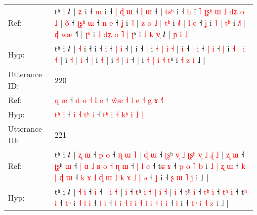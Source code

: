 \documentclass[10pt]{article}
\DeclareRobustCommand{\hl}[1]{{\textcolor{red}{#1}}}
\begin{document}
\begin{longtable}{ll}
Ref: & tʰ i ˩˥ | \hl{ʑ} i ˧\hl{ }\hl{m} i ˧\hl{ }\hl{|}\hl{ }\hl{ɖ} \hl{ɯ} ˧ \hl{ɭ} \hl{ɯ} ˧ |\hl{ }\hl{t}\hl{s}\hl{ʰ} i ˧ \hl{h} i\hl{̃}\hl{ }\hl{˥}\hl{ }\hl{ʈ}\hl{ʂ}\hl{ʰ}\hl{ }\hl{ɯ} \hl{˩} \hl{d}\hl{ʑ} \hl{o} \hl{˩} | \hl{o}\hl{̃} ˧ \hl{ʈ}\hl{ʂ}\hl{ʰ} \hl{ɯ} ˧ \hl{n} \hl{e} ˧ \hl{ʝ} i \hl{˥} |\hl{ }\hl{z} \hl{o} \hl{˩} |\hl{ }\hl{t}\hl{ʰ} i \hl{˩}\hl{˥} |\hl{ }\hl{l} \hl{e} ˧ \hl{ʝ} i \hl{˥} |\hl{ }\hl{t}\hl{ʰ} i \hl{˩}\hl{˥} |\hl{ }\hl{ɖ} \hl{w}\hl{æ} ˧\hl{˥} |\hl{ }\hl{ʈ}\hl{ʰ} i\hl{ }\hl{˩} \hl{d}\hl{ʑ} \hl{o} \hl{˥} \hl{|} \hl{ʈ}ʰ i \hl{˩} \hl{k} \hl{v}\hl{̩} ˩\hl{˥} |\hl{ }\hl{ɲ}\hl{ }\hl{i}\hl{ }\hl{˩}
 \\
Hyp: & tʰ i ˩˥ | \hl{˧} i ˧\hl{}\hl{} i ˧\hl{}\hl{}\hl{}\hl{} \hl{i} ˧ \hl{|} \hl{i} ˧ |\hl{}\hl{}\hl{}\hl{} i ˧ \hl{|} i\hl{}\hl{}\hl{}\hl{}\hl{}\hl{}\hl{}\hl{}\hl{} \hl{˧} \hl{}\hl{|} \hl{i} \hl{˧} | \hl{}\hl{i} ˧ \hl{}\hl{}\hl{|} \hl{i} ˧ \hl{|} \hl{i} ˧ \hl{|} i \hl{˧} |\hl{}\hl{} \hl{i} \hl{˧} |\hl{}\hl{}\hl{} i \hl{}\hl{˧} |\hl{}\hl{} \hl{i} ˧ \hl{|} i \hl{˧} |\hl{}\hl{}\hl{} i \hl{}\hl{˧} |\hl{}\hl{} \hl{}\hl{i} ˧\hl{} |\hl{}\hl{}\hl{} i\hl{}\hl{} \hl{}\hl{˧} \hl{|} \hl{i} \hl{˧} \hl{t}ʰ i \hl{˧} \hl{z} \hl{}\hl{i} ˩\hl{} |\hl{}\hl{}\hl{}\hl{}\hl{}\hl{}
 \\
\midrule
Utterance ID: & 220 \\
Ref: & \hl{}\hl{q} \hl{æ} ˧ \hl{d} \hl{o} \hl{˧}\hl{ }\hl{l} \hl{e} ˧ \hl{w}\hl{̃}\hl{æ} \hl{˧} \hl{l} \hl{e}\hl{ }\hl{˧} \hl{g} \hl{ɤ} \hl{˧}\hl{˥}
 \\
Hyp: & \hl{t}\hl{ʰ} \hl{i} ˧ \hl{i} \hl{˧} \hl{}\hl{t}\hl{ʰ} \hl{i} ˧ \hl{}\hl{t}\hl{ʰ} \hl{i} \hl{˧} \hl{}\hl{k}\hl{ʰ} \hl{i} \hl{˩} \hl{}\hl{|}
 \\
\midrule
Utterance ID: & 221 \\
Ref: & tʰ i ˩˥ | \hl{ʐ} \hl{ɯ} ˧\hl{ }\hl{p} \hl{o} ˧ \hl{ɳ} \hl{ɯ} \hl{˥} |\hl{ }\hl{ɖ} \hl{ɯ} ˧ \hl{ʈ}\hl{ʂ}ʰ\hl{ }\hl{v}\hl{̩}\hl{ }\hl{˩} \hl{ʈ}\hl{ʂ}\hl{ʰ} \hl{v}\hl{̩} \hl{˩} \hl{ɻ}\hl{̍} \hl{˩} |\hl{ }\hl{ʐ} \hl{ɯ} ˧ \hl{ʈ}\hl{ʂ}ʰ \hl{ɯ} ˧\hl{ }\hl{|}\hl{ }\hl{ɑ}\hl{ }\hl{˩}\hl{ }\hl{ʁ}\hl{ }\hl{o} \hl{˧}\hl{ }\hl{ɳ} \hl{ɯ} ˧ \hl{|}\hl{ }\hl{l} \hl{e} ˧ t\hl{ɕ} \hl{ɤ} ˧\hl{ }\hl{p}\hl{ }\hl{o} \hl{˥}\hl{ }\hl{b} i\hl{ }\hl{˩} \hl{|} \hl{ʐ} \hl{ɯ} ˧\hl{ }\hl{k}\hl{ }\hl{|} \hl{ɖ} \hl{ɯ} ˧ \hl{k} \hl{ɤ} \hl{˩} \hl{ɖ} \hl{ɯ} \hl{˩} \hl{k} \hl{ɤ} \hl{˩} \hl{|} \hl{ə} ˧ \hl{ʝ} i ˧ \hl{}\hl{ʂ} \hl{ɯ} \hl{˥} \hl{ʝ} i ˩ |
 \\
Hyp: & tʰ i ˩˥ | \hl{˧} \hl{i} ˧\hl{}\hl{} \hl{i} ˧ \hl{|} \hl{i} \hl{˧} |\hl{}\hl{} \hl{i} ˧ \hl{}\hl{t}ʰ\hl{}\hl{}\hl{}\hl{}\hl{} \hl{}\hl{}\hl{i} \hl{}\hl{˧} \hl{|} \hl{}\hl{i} \hl{˧} |\hl{}\hl{} \hl{i} ˧ \hl{}\hl{t}ʰ \hl{i} ˧\hl{}\hl{}\hl{}\hl{}\hl{}\hl{}\hl{}\hl{}\hl{}\hl{} \hl{}\hl{t}\hl{ʰ} \hl{i} ˧ \hl{}\hl{t}\hl{ʰ} \hl{i} ˧ t\hl{ʰ} \hl{i} ˧\hl{}\hl{}\hl{}\hl{} \hl{}\hl{t}\hl{ʰ} i\hl{}\hl{} \hl{˧} \hl{l} \hl{i} ˧\hl{}\hl{}\hl{}\hl{} \hl{l} \hl{i} ˧ \hl{l} \hl{i} \hl{˧} \hl{l} \hl{i} \hl{˧} \hl{l} \hl{i} \hl{˧} \hl{l} \hl{i} ˧ \hl{l} i ˧ \hl{t}\hl{ʰ} \hl{i} \hl{˧} \hl{z} i ˩ |

\end{longtable}
\end{document}
